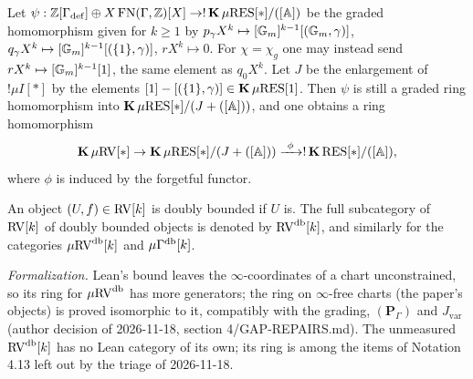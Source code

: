 \setcounter{theorem}{7}
\begin{remark}
\label{s4-alternative-psi}
\leanok
{}
Let $\psi : \mathbb{Z}[\Gamma_{\mathrm{def}}] \oplus X \operatorname{FN}(\Gamma, \mathbb{Z})[X] \to !\operatorname{\mathbf{K}} \mu\mathrm{RES}[*] / ([\mathbb{A}])$ be the graded homomorphism given for $k \geq 1$ by $p_\gamma X^k \mapsto [\mathbb{G}_m]^{k-1}[(\mathbb{G}_m, \gamma)]$, $q_\gamma X^k \mapsto [\mathbb{G}_m]^{k-1}[(\{1\}, \gamma)]$, $r X^k \mapsto 0$. For $\chi = \chi_g$ one may instead send $r X^k \mapsto [\mathbb{G}_m]^{k-1}[1]$, the same element as $q_0 X^k$. Let $J$ be the enlargement of $!\mu I[*]$ by the elements $[1] - [(\{1\}, \gamma)] \in \operatorname{\mathbf{K}} \mu\mathrm{RES}[1]$. Then $\psi$ is still a graded ring homomorphism into $\operatorname{\mathbf{K}} \mu\mathrm{RES}[*] / (J + ([\mathbb{A}]))$, and one obtains a ring homomorphism \[ \operatorname{\mathbf{K}} \mu\mathrm{RV}[*] \to \operatorname{\mathbf{K}} \mu\mathrm{RES}[*] / (J + ([\mathbb{A}])) \xrightarrow{\ \phi\ } !\operatorname{\mathbf{K}} \mathrm{RES}[*] / ([\mathbb{A}]), \] where $\phi$ is induced by the forgetful functor.
\end{remark}

\setcounter{theorem}{8}
\begin{definition}
\label{db-RV}
\leanok
{}
An object $(U, f) \in \mathrm{RV}[k]$ is doubly bounded if $U$ is. The full subcategory of $\mathrm{RV}[k]$ of doubly bounded objects is denoted by $\mathrm{RV}^{\operatorname{db}}[k]$, and similarly for the categories $\mu\mathrm{RV}^{\operatorname{db}}[k]$ and $\mu\Gamma^{\operatorname{db}}[k]$.

\emph{Formalization.} Lean's bound leaves the $\infty$-coordinates of a chart unconstrained, so its ring for $\mu\mathrm{RV}^{\operatorname{db}}$ has more generators; the ring on $\infty$-free charts (the paper's objects) is proved isomorphic to it, compatibly with the grading, $(\mathbf{P}_\Gamma)$ and $J_{\mathrm{var}}$ (author decision of 2026-11-18, section 4/GAP-REPAIRS.md). The unmeasured $\mathrm{RV}^{\operatorname{db}}[k]$ has no Lean category of its own; its ring is among the items of Notation 4.13 left out by the triage of 2026-11-18.
\end{definition}

